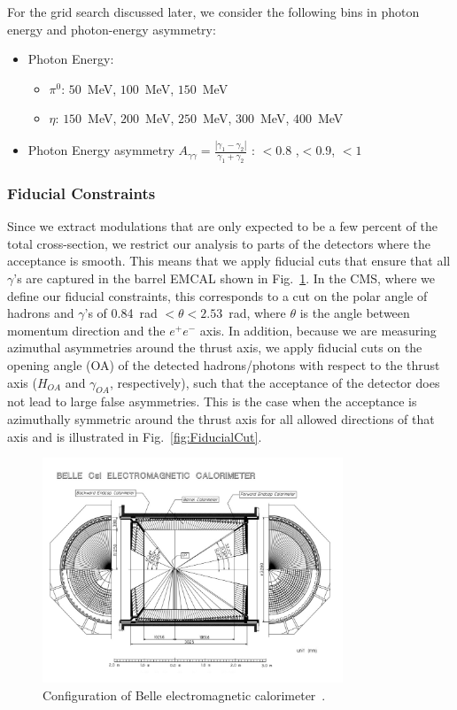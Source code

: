For the grid search discussed later, we consider the following bins in photon energy and photon-energy asymmetry:
\begin{itemize}
  \item Photon Energy:
    \begin{itemize}
      \item $\pi^{0}$: $50$~MeV, $100$~MeV, $150$~MeV 
      \item $\eta$: $150$~MeV, $200$~MeV, $250$~MeV, $300$~MeV, $400$~MeV
    \end{itemize}
  \item Photon Energy asymmetry $A_{\gamma\gamma}=\frac{|\gamma_1-\gamma_2|}{\gamma_1+\gamma_2}$ : $<0.8$ ,$<0.9$, $<1$
\end{itemize}



\subsubsection{Fiducial Constraints}
\label{sec:fiducialcut}
Since we extract modulations that are only expected to be a few percent of the total cross-section, we restrict our analysis to parts of the detectors where the acceptance is smooth. This means that we apply fiducial cuts that ensure that all $\gamma$'s are captured in the barrel EMCAL shown in Fig.~\ref{fig:2}. In the CMS, where we define our fiducial constraints, this corresponds to a cut on the polar angle of  hadrons and $\gamma$'s of 0.84~rad $<\theta<2.53$~rad, where $\theta$ is the angle between momentum direction and the $e^+e^-$ axis.
  In addition, because we are measuring azimuthal asymmetries around the thrust axis, we apply fiducial cuts on the opening angle (OA) of the detected hadrons/photons with respect to the thrust axis ($H_{OA}$ and $\gamma_{OA}$, respectively), such that the acceptance of the detector does not lead to large false asymmetries. This is the case when the acceptance is azimuthally symmetric around the thrust axis for all allowed directions of that axis and is illustrated in Fig.~\ref{fig:FiducialCut}. 

\begin{figure}[H]
  \centering
  \includegraphics[width=0.8\textwidth,natwidth=610,natheight=642]{figure_dataselection/EMCAL.pdf}
  \caption{Configuration of Belle electromagnetic calorimeter~\cite{BelleDetector}.}
  \label{fig:2}
\end{figure}

